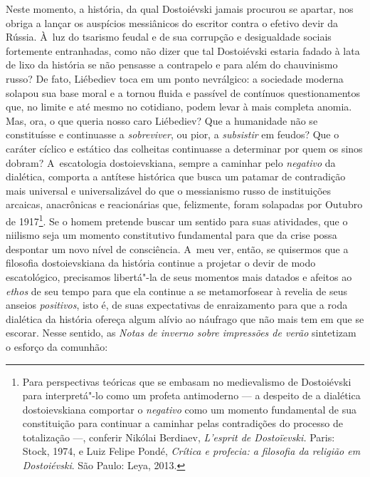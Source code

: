 Neste momento, a história, da qual Dostoiévski jamais procurou se
apartar, nos obriga a lançar os auspícios messiânicos do escritor contra
o efetivo devir da Rússia. À~luz do tsarismo feudal e de sua corrupção e
desigualdade sociais fortemente entranhadas, como não dizer que tal
Dostoiévski estaria fadado à lata de lixo da história se não pensasse a
contrapelo e para além do chauvinismo russo? De fato, Liébediev toca em
um ponto nevrálgico: a sociedade moderna solapou sua base moral e a
tornou fluida e passível de contínuos questionamentos que, no limite e
até mesmo no cotidiano, podem levar à mais completa anomia. Mas, ora, o
que queria nosso caro Liébediev? Que a humanidade não se constituísse e
continuasse a \emph{sobreviver}, ou pior, a \emph{subsistir} em feudos?
Que o caráter cíclico e estático das colheitas continuasse a determinar
por quem os sinos dobram? A~escatologia dostoievskiana, sempre a
caminhar pelo \emph{negativo} da dialética, comporta a antítese
histórica que busca um patamar de contradição mais universal e
universalizável do que o messianismo russo de instituições arcaicas,
anacrônicas e reacionárias que, felizmente, foram solapadas por Outubro
de 1917\footnote{Para perspectivas teóricas que se embasam no
  medievalismo de Dostoiévski para interpretá"-lo como um profeta
  antimoderno --- a despeito de a dialética dostoievskiana comportar o
  \emph{negativo} como um momento fundamental de sua constituição para
  continuar a caminhar pelas contradições do processo de totalização ---,
  conferir Nikólai Berdiaev, \emph{L'esprit de Dostoïevski.} Paris:
  Stock, 1974, e Luiz Felipe Pondé, \emph{Crítica e profecia: a
  filosofia da religião em Dostoiévski}. São Paulo: Leya, 2013.}. Se o
homem pretende buscar um sentido para suas atividades, que o niilismo
seja um momento constitutivo fundamental para que da crise possa
despontar um novo nível de consciência. A~meu ver, então, se quisermos
que a filosofia dostoievskiana da história continue a projetar o devir
de modo escatológico, precisamos libertá"-la de seus momentos mais
datados e afeitos ao \emph{ethos} de seu tempo para que ela continue a
se metamorfosear à revelia de seus anseios \emph{positivos}, isto é, de
suas expectativas de enraizamento para que a roda dialética da história
ofereça algum alívio ao náufrago que não mais tem em que se escorar.
Nesse sentido, as \emph{Notas de inverno sobre impressões de verão}
sintetizam o esforço da comunhão:

